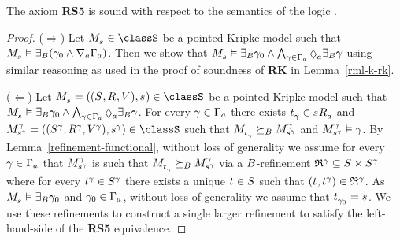 \begin{lemma}\label{rml-s5-rs5}
The axiom {\bf RS5} is sound with respect to the semantics of the logic \logicRmlS{}.
\end{lemma}

\begin{proof}
($\Rightarrow$) 
Let $\kPModel{\kStateS} \in \classS$ be a pointed Kripke model such that $\kPModel{\kStateS} \entails \somerefsBs (\gamma_0 \land \coversA \Gamma_\agentA)$.
Then we show that $\kPModel{\kStateS} \entails \somerefsBs \gamma_0 \land \bigwedge_{\gamma \in \Gamma_\agentA} \possibleA \somerefsBs \gamma$ using similar reasoning as used in the proof of soundness of {\bf RK} in Lemma~\ref{rml-k-rk}.

($\Leftarrow$)
Let $\kPModelAndTuple{\kStateS} \in \classS$ be a pointed Kripke model such that $\kPModel{\kStateS} \entails \somerefsBs \gamma_0 \land \bigwedge_{\gamma \in \Gamma_\agentA} \possibleA \somerefsBs \gamma$.
For every $\gamma \in \Gamma_\agentA$ there exists $\kStateT_\gamma \in \kSuccessorsA{\kStateS}$ and $\kPModelAndTuple[\gamma]{\kStateS[\gamma]} \in \classS$ such that $\kPModel{\kStateT_\gamma} \simulatesBs \kPModel[\gamma]{\kStateS[\gamma]}$ and $\kPModel[\gamma]{\kStateS[\gamma]} \entails \gamma$.
By Lemma~\ref{refinement-functional}, without loss of generality we assume for every $\gamma \in \Gamma_\agentA$ that $\kPModel[\gamma]{\kStateS[\gamma]}$ is such that $\kPModel{\kStateT_\gamma} \simulatesBs \kPModel[\gamma]{\kStateS[\gamma]}$ via a $\agentsB$-refinement $\refinement^{\gamma} \subseteq \kStates \times \kStates[\gamma]$ where for every $\kStateT[\gamma] \in \kStates[\gamma]$ there exists a unique $\kStateT \in \kStates$ such that $(\kStateT, \kStateT[\gamma]) \in \refinement^{\gamma}$.
As $\kPModel{\kStateS} \entails \somerefsBs \gamma_0$ and $\gamma_0 \in \Gamma_\agentA$, without loss of generality we assume that $\kStateT_{\gamma_0} = \kStateS$.
We use these refinements to construct a single larger refinement to satisfy the left-hand-side of the {\bf RS5} equivalence.


\end{proof}
